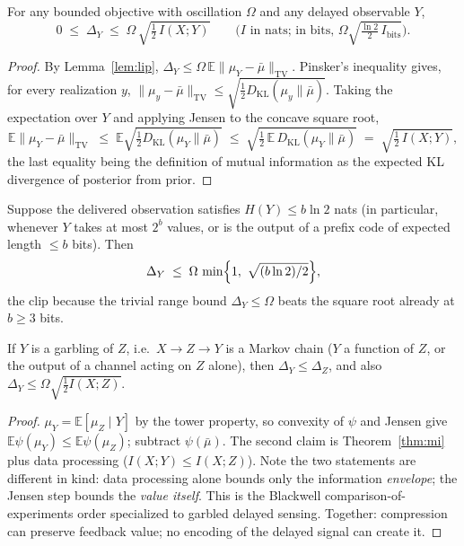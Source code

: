 \documentclass[acmsmall,screen,review,anonymous]{acmart}
\newcommand{\TV}{\mathrm{TV}}
\newcommand{\KL}{D_{\mathrm{KL}}}
\newcommand{\E}{\mathbb{E}}
\begin{document}
\begin{theorem}\label{thm:mi}
For any bounded objective with oscillation $\Omega$ and any delayed
observable $Y$,
\begin{equation}\label{eq:mi}
0\;\le\;\Delta_Y\;\le\;\Omega\,\sqrt{\tfrac12\,I(X;Y)}
\qquad\text{($I$ in nats; in bits, }\Omega\sqrt{\tfrac{\ln 2}{2}\,I_{\mathrm{bits}}}\text{).}
\end{equation}
\end{theorem}

\begin{proof}
By Lemma~\ref{lem:lip}, $\Delta_Y\le\Omega\,\E\|\mu_Y-\bar\mu\|_{\TV}$.
Pinsker's inequality gives, for every realization $y$,
$\|\mu_y-\bar\mu\|_{\TV}\le\sqrt{\tfrac12\KL(\mu_y\|\bar\mu)}$. Taking the
expectation over $Y$ and applying Jensen to the concave square root,
\[
\E\|\mu_Y-\bar\mu\|_{\TV}
\;\le\;\E\sqrt{\tfrac12\KL(\mu_Y\|\bar\mu)}
\;\le\;\sqrt{\tfrac12\,\E\,\KL(\mu_Y\|\bar\mu)}
\;=\;\sqrt{\tfrac12\,I(X;Y)},
\]
the last equality being the definition of mutual information as the expected
KL divergence of posterior from prior.
\end{proof}

\begin{corollary}\label{cor:bits}
Suppose the delivered observation satisfies $H(Y)\le b\ln 2$ nats (in
particular, whenever $Y$ takes at most $2^b$ values, or is the output of a
prefix code of expected length $\le b$ bits). Then
\[
\Delta_Y\;\le\;\Omega\,\min\Bigl\{1,\ \sqrt{(b\ln 2)/2}\Bigr\},
\]
the clip because the trivial range bound $\Delta_Y\le\Omega$ beats the
square root already at $b\ge 3$ bits.
\end{corollary}

\begin{lemma}\label{lem:blackwell}
If $Y$ is a garbling of $Z$, i.e.\ $X\to Z\to Y$ is a Markov chain ($Y$ a
function of $Z$, or the output of a channel acting on $Z$ alone), then $\Delta_Y\le\Delta_Z$, and also
$\Delta_Y\le\Omega\sqrt{\tfrac12 I(X;Z)}$.
\end{lemma}
\begin{proof}
$\mu_Y=\E[\mu_Z\mid Y]$ by the tower property, so convexity of $\psi$ and
Jensen give $\E\psi(\mu_Y)\le\E\psi(\mu_Z)$; subtract $\psi(\bar\mu)$. The
second claim is Theorem~\ref{thm:mi} plus data processing
($I(X;Y)\le I(X;Z)$). Note the two statements are different in kind: data
processing alone bounds only the information \emph{envelope}; the Jensen
step bounds the \emph{value itself}. This is the Blackwell comparison-of-
experiments order \cite{blackwell53} specialized to garbled delayed
sensing. Together: compression can preserve feedback value; no encoding of
the delayed signal can create it.
\end{proof}
\end{document}
